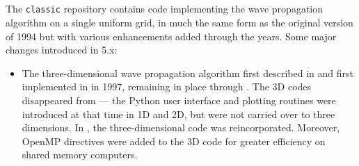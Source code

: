 %
%
%

\subsection{\classic}
The \texttt{classic} repository contains code implementing the wave
propagation algorithm on a single uniform grid, in much the same form as the
original  version of 1994 but with various enhancements added
through the years.  Some major changes introduced in \clawpack 5.x:
\begin{itemize}
    \item The three-dimensional wave propagation algorithm first described
in \cite{jol:thesis, jol-rjl:3d} 
and first implemented in  in 1997, remaining in place through
.  The 3D codes 
disappeared from  --- the Python user interface and plotting
routines were introduced at that time in 1D and 2D, but were not 
carried over to three dimensions.  In , the three-dimensional
code was reincorporated.  Moreover, OpenMP directives were added to the 3D code
for greater efficiency on shared memory computers.


\end{itemize}
